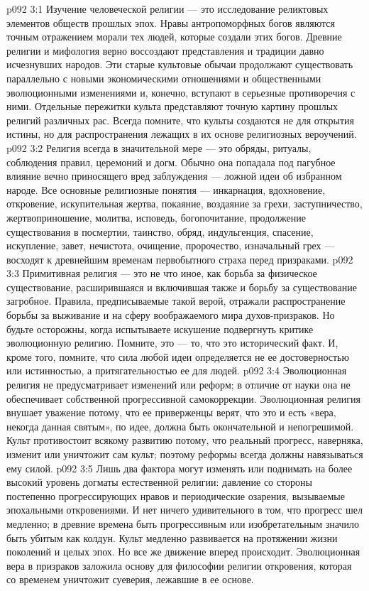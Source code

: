 \vs p092 3:1 Изучение человеческой религии --- это исследование реликтовых элементов обществ прошлых эпох. Нравы антропоморфных богов являются точным отражением морали тех людей, которые создали этих богов. Древние религии и мифология верно воссоздают представления и традиции давно исчезнувших народов. Эти старые культовые обычаи продолжают существовать параллельно с новыми экономическими отношениями и общественными эволюционными изменениями и, конечно, вступают в серьезные противоречия с ними. Отдельные пережитки культа представляют точную картину прошлых религий различных рас. Всегда помните, что культы создаются не для открытия истины, но для распространения лежащих в их основе религиозных вероучений.
\vs p092 3:2 Религия всегда в значительной мере --- это обряды, ритуалы, соблюдения правил, церемоний и догм. Обычно она попадала под пагубное влияние вечно приносящего вред заблуждения --- ложной идеи об избранном народе. Все основные религиозные понятия --- инкарнация, вдохновение, откровение, искупительная жертва, покаяние, воздаяние за грехи, заступничество, жертвоприношение, молитва, исповедь, богопочитание, продолжение существования в посмертии, таинство, обряд, индульгенция, спасение, искупление, завет, нечистота, очищение, пророчество, изначальный грех --- восходят к древнейшим временам первобытного страха перед призраками.
\vs p092 3:3 \pc Примитивная религия --- это не что иное, как борьба за физическое существование, расширившаяся и включившая также и борьбу за существование загробное. Правила, предписываемые такой верой, отражали распространение борьбы за выживание и на сферу воображаемого мира духов\hyp{}призраков. Но будьте осторожны, когда испытываете искушение подвергнуть критике эволюционную религию. Помните, это --- то, что  это исторический факт. И, кроме того, помните, что сила любой идеи определяется не ее достоверностью или истинностью, а притягательностью ее для людей.
\vs p092 3:4 \pc Эволюционная религия не предусматривает изменений или реформ; в отличие от науки она не обеспечивает собственной прогрессивной самокоррекции. Эволюционная религия внушает уважение потому, что ее приверженцы верят, что это и есть  «вера, некогда данная святым», по идее, должна быть окончательной и непогрешимой. Культ противостоит всякому развитию потому, что реальный прогресс, наверняка, изменит или уничтожит сам культ; поэтому реформы всегда должны навязываться ему силой.
\vs p092 3:5 Лишь два фактора могут изменять или поднимать на более высокий уровень догматы естественной религии: давление со стороны постепенно прогрессирующих нравов и периодические озарения, вызываемые эпохальными откровениями. И нет ничего удивительного в том, что прогресс шел медленно; в древние времена быть прогрессивным или изобретательным значило быть убитым как колдун. Культ медленно развивается на протяжении жизни поколений и целых эпох. Но все же движение вперед происходит. Эволюционная вера в призраков заложила основу для философии религии откровения, которая со временем уничтожит суеверия, лежавшие в ее основе.

